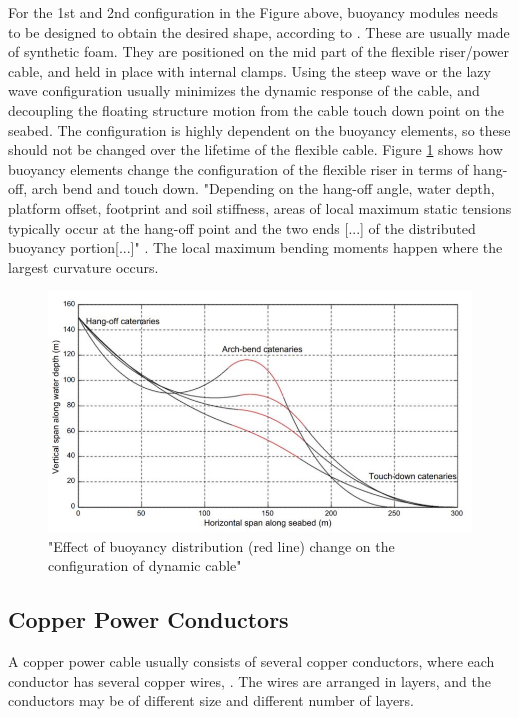 \noindent For the 1st and 2nd configuration in the Figure above, buoyancy modules needs to be designed to obtain the desired shape, according to \cite{srinil2016}. These are usually made of synthetic foam. They are positioned on the mid part of the flexible riser/power cable, and held in place with internal clamps. Using the steep wave or the lazy wave configuration usually minimizes the dynamic response of the cable, and decoupling the floating structure motion from the cable touch down point on the seabed. The configuration is highly dependent on the buoyancy elements, so these should not be changed over the lifetime of the flexible cable. Figure \ref{fig:bend} shows how buoyancy elements change the configuration of the flexible riser in terms of hang-off, arch bend and touch down. "Depending on the hang-off angle, water depth, platform offset, footprint and soil stiffness, areas of local maximum static tensions typically occur at the hang-off point and
the two ends [...] of the distributed buoyancy portion[...]" \cite{srinil2016}. The local maximum bending moments happen where the largest curvature occurs.

\begin{figure}[H]
\centering
\includegraphics[scale=0.6]{figures/bend}
\caption[$\; \:$Effect of buoyancy distribution]{"Effect of buoyancy distribution (red line) change on the configuration of dynamic
cable" \cite{srinil2016}}
 \label{fig:bend}
\end{figure}

\subsection{Copper Power Conductors}
  A copper power cable usually consists of several copper conductors, where each conductor has several copper wires, \cite{Nasution2013}. The wires are arranged in layers, and the conductors may be of different size and different number of layers.
  
